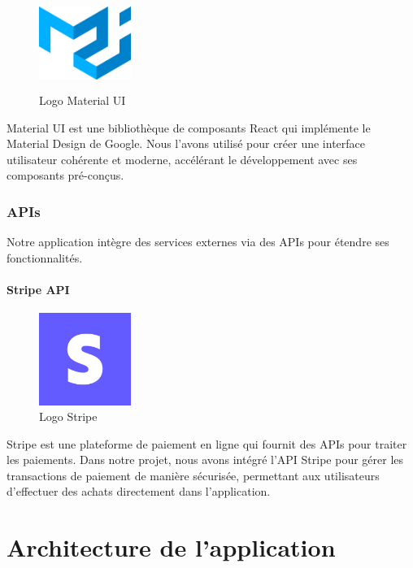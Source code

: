 \begin{figure}[H]
    \centering
    \includegraphics[width=3cm, height=3cm]{images/mui.png}
    \caption{Logo Material UI}
\end{figure}

\noindent Material UI \cite{mui} est une bibliothèque de composants React qui implémente le Material Design de Google. Nous l'avons utilisé pour créer une interface utilisateur cohérente et moderne, accélérant le développement avec ses composants pré-conçus.

\subsubsection{APIs}

\noindent Notre application intègre des services externes via des APIs pour étendre ses fonctionnalités.

\paragraph{Stripe API}

\begin{figure}[H]
    \centering
    \includegraphics[width=3cm, height=3cm]{images/stripe.png}
    \caption{Logo Stripe}
\end{figure}

\noindent Stripe \cite{stripe} est une plateforme de paiement en ligne qui fournit des APIs pour traiter les paiements. Dans notre projet, nous avons intégré l'API Stripe pour gérer les transactions de paiement de manière sécurisée, permettant aux utilisateurs d'effectuer des achats directement dans l'application.

\section{Architecture de l'application}

